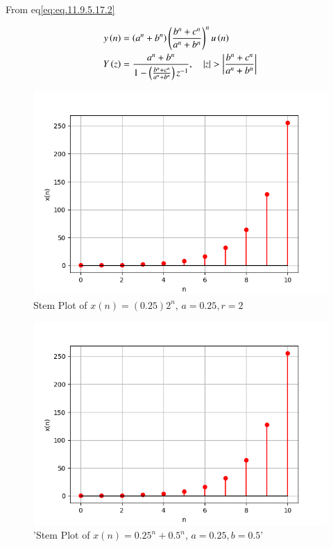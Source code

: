 \documentclass[journal,12pt,twocolumn]{IEEEtran}
\theoremstyle{remark}
\begin{document}
From eq\eqref{eq:eq.11.9.5.17.2}

\begin{align}
    y\left(n\right) &= \left(a^n + b^n\right) \left(\frac{b^n + c^n}{a^n + b^n}\right)^{n} u\left(n\right)\\
    Y\left(z\right) &= \frac{a^n + b^n}{1-\left(\frac{b^n + c^n}{a^n + b^n}\right) z^{-1}}, \quad \left\vert z\right\vert>\left\vert\frac{b^n + c^n}{a^n + b^n}\right\vert
\end{align}


\begin{figure}[ht]
   \centering
   \includegraphics[width=0.8\columnwidth]{figs/gp1.png}
   \caption{Stem Plot of $x(n) = (0.25) 2^n$, $a= 0.25, r=2$}
\end{figure}

\begin{figure}[ht]
   \centering
   \includegraphics[width=0.8\columnwidth]{figs/gp1.png}
   \caption{'Stem Plot of $x(n) = 0.25^n + 0.5^n$, $a=0.25, b=0.5$'}
\end{figure}
\end{document}
